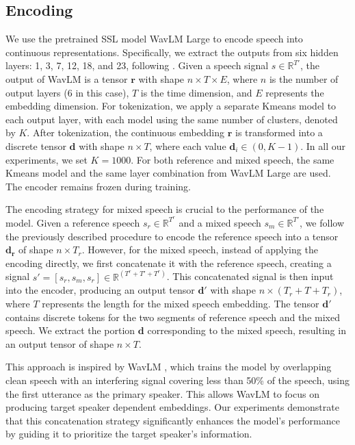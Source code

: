 \documentclass[conference]{IEEEtran}
\begin{document}
\subsection{Encoding}

We use the pretrained SSL model WavLM Large \cite{wavlm} to encode speech into continuous representations. Specifically, we extract the outputs from six hidden layers: 1, 3, 7, 12, 18, and 23, following \cite{dasb}. Given a speech signal \(s \in \mathbb{R}^{T'}\), the output of WavLM is a tensor \(\bm{r}\) with shape \(n \times T \times E\), where \(n\) is the number of output layers (6 in this case), \(T\) is the time dimension, and \(E\) represents the embedding dimension. For tokenization, we apply a separate Kmeans model to each output layer, with each model using the same number of clusters, denoted by \(K\). After tokenization, the continuous embedding \(\bm{r}\) is transformed into a discrete tensor \(\bm{d}\) with shape \(n \times T\), where each value \(\bm{d}_{i} \in (0, K-1) \). In all our experiments, we set \(K = 1000\). For both reference and mixed speech, the same Kmeans model and the same layer combination from WavLM Large are used. The encoder remains frozen during training.

The encoding strategy for mixed speech is crucial to the performance of the model. Given a reference speech \(s_r \in \mathbb{R}^{T^r}\) and a mixed speech \(s_m \in \mathbb{R}^{T'}\), we follow the previously described procedure to encode the reference speech into a tensor \(\bm{d_r}\) of shape \(n \times T_r\). However, for the mixed speech, instead of applying the encoding directly, we first concatenate it with the reference speech, creating a signal \(s' = [s_r, s_m, s_r] \in \mathbb{R}^{(T^r + T' + T^r)}\). This concatenated signal is then input into the encoder, producing an output tensor \(\bm{d'}\) with shape \(n \times (T_r + T + T_r)\), where \(T\) represents the length for the mixed speech embedding. The tensor \(\bm{d'}\) contains discrete tokens for the two segments of reference speech and the mixed speech. We extract the portion \(\bm{d}\) corresponding to the mixed speech, resulting in an output tensor of shape \(n \times T\).

This approach is inspired by WavLM \cite{wavlm}, which trains the model by overlapping clean speech with an interfering signal covering less than 50\% of the speech, using the first utterance as the primary speaker. This allows WavLM to focus on producing target speaker dependent embeddings. Our experiments demonstrate that this concatenation strategy significantly enhances the model's performance by guiding it to prioritize the target speaker's information.
\end{document}
